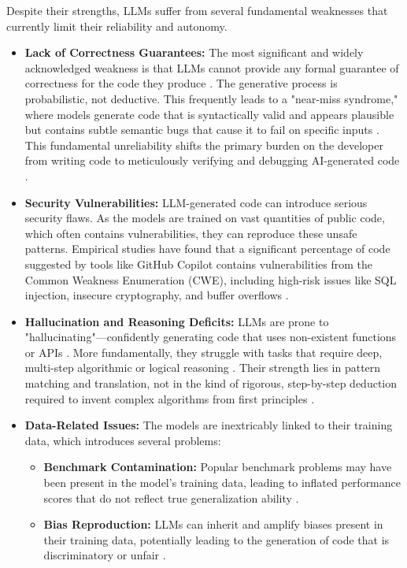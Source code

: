 \documentclass[12pt, a4paper]{report}
\begin{document}
Despite their strengths, LLMs suffer from several fundamental weaknesses that currently limit their reliability and autonomy.
\begin{itemize}
    \item \textbf{Lack of Correctness Guarantees:} The most significant and widely acknowledged weakness is that LLMs cannot provide any formal guarantee of correctness for the code they produce \citep{gulwani2017program}. The generative process is probabilistic, not deductive. This frequently leads to a "near-miss syndrome," where models generate code that is syntactically valid and appears plausible but contains subtle semantic bugs that cause it to fail on specific inputs \citep{manna1980theory}. This fundamental unreliability shifts the primary burden on the developer from writing code to meticulously verifying and debugging AI-generated code \citep{barker2023automatically}.
    \item \textbf{Security Vulnerabilities:} LLM-generated code can introduce serious security flaws. As the models are trained on vast quantities of public code, which often contains vulnerabilities, they can reproduce these unsafe patterns. Empirical studies have found that a significant percentage of code suggested by tools like GitHub Copilot contains vulnerabilities from the Common Weakness Enumeration (CWE), including high-risk issues like SQL injection, insecure cryptography, and buffer overflows \citep{chen2021evaluating}.
    \item \textbf{Hallucination and Reasoning Deficits:} LLMs are prone to "hallucinating"—confidently generating code that uses non-existent functions or APIs \citep{wei2022emergent}. More fundamentally, they struggle with tasks that require deep, multi-step algorithmic or logical reasoning \citep{zhang2024algo}. Their strength lies in pattern matching and translation, not in the kind of rigorous, step-by-step deduction required to invent complex algorithms from first principles \citep{bubeck2023sparks}.
    \item \textbf{Data-Related Issues:} The models are inextricably linked to their training data, which introduces several problems:
    \begin{itemize}
        \item \textbf{Benchmark Contamination:} Popular benchmark problems may have been present in the model's training data, leading to inflated performance scores that do not reflect true generalization ability \citep{chen2021evaluating}.
        \item \textbf{Bias Reproduction:} LLMs can inherit and amplify biases present in their training data, potentially leading to the generation of code that is discriminatory or unfair \citep{chen2021evaluating}.

\end{itemize}
\end{itemize}
\end{document}
